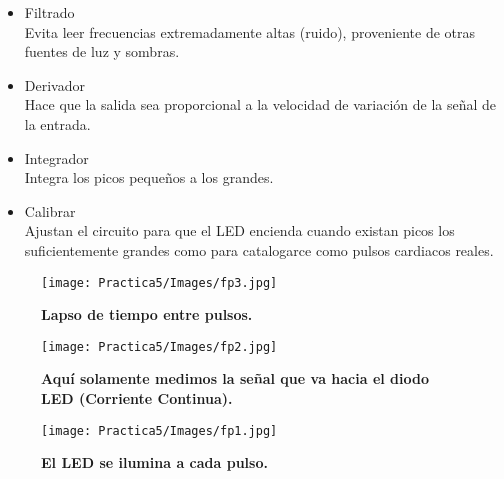 \documentclass[12pt]{article}
\begin{document}
            \begin{itemize}
                \item Filtrado  \\
                Evita leer frecuencias extremadamente altas (ruido), proveniente de otras fuentes de luz y sombras.
                
                \item Derivador \\
                Hace que la salida sea proporcional a la velocidad de variación de la señal de la entrada.
                
                \item Integrador    \\
                Integra los picos pequeños a los grandes.
                
                \item Calibrar  \\
                Ajustan el circuito para que el LED encienda cuando existan picos los suficientemente grandes como para catalogarce como pulsos cardiacos reales.
            \end{itemize}

            \newpage
            \begin{figure}[h!]
               \centering
               \texttt{[image: Practica5/Images/fp3.jpg]}
               
               \textbf{Lapso de tiempo entre pulsos.}
               
                \texttt{[image: Practica5/Images/fp2.jpg]}
                
                \textbf{Aquí solamente medimos la señal que va hacia el diodo LED (Corriente Continua).}
                
                \texttt{[image: Practica5/Images/fp1.jpg]}
                
                \textbf{El LED se ilumina a cada pulso.}
                
                
           \end{figure}
           
	\newpage
\end{document}
